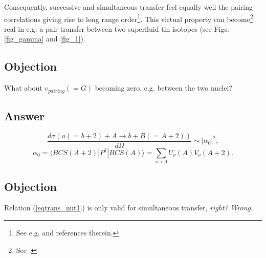 Consequently, successive and simultaneous transfer feel equally well the pairing correlations giving rise to long range order\footnote{See e.g. \cite{Potel:17} and references therein.}. This virtual property can become\footnote{See \cite{Oertzen:13,vonOertzen:01}.} real in e.g. a pair transfer between two superfluid tin isotopes (see Figs. \ref{fig_gamma} and \ref{fig_1}).
\subsection*{Objection}
What about $v_{pairing}(=G)$ becoming zero, e.g. between the two nuclei?
\subsection*{Answer}
\begin{equation}
\frac{d\sigma(a(=b+2)+A\rightarrow b+B(=A+2))}{d\Omega}\sim |\alpha_0|^2,
\end{equation}
\begin{equation}\label{eqtrans_nut1}
\alpha_0=\langle BCS(A+2) |P^\dagger|BCS(A)\rangle=\sum_{\nu>0}U_{\nu}(A)V_{\nu}(A+2).
\end{equation}
\subsection*{Objection}
Relation (\ref{eqtrans_nut1}) is only valid for simultaneous transfer, \textit{right?} \textit{Wrong}.
